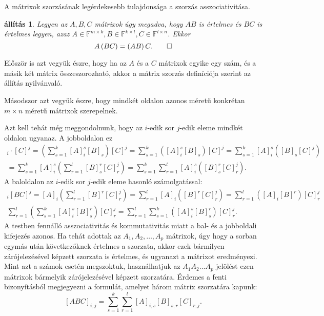 \documentclass[a4paper, showtrims]{memoir}
\makeatletter
\renewenvironment{proof}[1][\proofname]
    {\par\pushQED{\qed}%
    \normalfont \topsep6\p@\@plus6\p@\relax
    \trivlist
    \item[\hskip\labelsep
        \itshape
    #1\@addpunct{:}]\ignorespaces}
    {\popQED\endtrivlist\@endpefalse}
\theoremstyle{plain}
\newtheorem{proposition}{állítás}[chapter]
\theoremstyle{remark}
\theoremstyle{definition}
\makeatother
\begin{document}
A mátrixok szorzásának legérdekesebb tulajdonsága a szorzás asszociativitása.
\begin{proposition}
	Legyen az $A,B,C$ mátrixok úgy megadva, hogy $AB$ is értelmes és $BC$ is értelmes legyen,
	azaz $A\in\mathbb{F}^{m\times k},B\in\mathbb{F}^{k\times l}, C\in\mathbb{F}^{l\times n}$.
	Ekkor
	\[
		A\left( BC \right)=\left( AB \right)C.\qedhere
	\]
\end{proposition}
\begin{proof}
	Először is azt vegyük észre,
	hogy ha az $A$ és a $C$ mátrixok egyike egy szám,
	és a másik két mátrix összeszorozható,
	akkor a mátrix szorzás definíciója szerint az állítás nyilvánvaló.

	Másodszor azt vegyük észre, hogy mindkét oldalon azonos méretű
	konkrétan $m\times n$ méretű mátrixok szerepelnek.

	Azt kell tehát még meggondolnunk,
	hogy az $i$-edik sor $j$-edik eleme mindkét oldalon ugyanaz.
	A jobboldalon ez
	\begin{multline*}
		[AB]_i\cdot [C]^j
		=
		\left( \sum_{s=1}^k[A]_i^s[B]_s \right)[C]^j
		=
		\sum_{s=1}^k\left([A]_i^s[B]_s\right)[C]^j
		=
		\sum_{s=1}^k[A]_i^s\left([B]_s[C]^j\right)
		\\
		=
		\sum_{s=1}^k[A]_i^s\left(\sum_{r=1}^l[B]_s^r[C]_r^j\right)
		=
		\sum_{s=1}^k\sum_{r=1}^l[A]_i^s([B]_s^r[C]_r^j).
	\end{multline*}
	A baloldalon
	az $i$-edik sor $j$-edik eleme hasonló számolgatással:
	\begin{multline*}
		[A]_i[BC]^j=
		[A]_i\left( \sum_{r=1}^l[B]^r[C]_r^j \right)
		=
		\sum_{r=1}^l[A]_i\left([B]^r[C]_r^j\right)
		=
		\sum_{r=1}^l\left([A]_i[B]^r\right)[C]_r^j
		\\
		\sum_{r=1}^l\left(\sum_{s=1}^k[A]_i^s[B]_s^r\right)[C]_r^j
		=
		\sum_{r=1}^l\sum_{s=1}^k\left([A]_i^s[B]_s^r\right)[C]_r^j.
	\end{multline*}
	A testben fennálló asszociativitás és kommutativitás miatt a bal- és a jobboldali kifejezés azonos.
\end{proof}
Ha tehát adottak az $A_1,A_2,\ldots,A_p$ mátrixok, úgy hogy a sorban egymás után következőknek értelmes a szorzata,
akkor ezek bármilyen zárójelezésével képzett szorzata is értelmes,
és ugyanazt a mátrixot eredményezi.
Mint azt a számok esetén megszoktuk,
használhatjuk az $A_1A_2\dots A_p$ jelölést ezen mátrixok bármelyik zárójelezésével képzett szorzatára.
Érdemes a fenti bizonyításból megjegyezni a formulát,
amelyet három mátrix szorzatára kapunk:
\[
	\left[ ABC \right]_{i,j}
	=
	\sum_{s=1}^k\sum_{r=1}^l\left[ A \right]_{i,s}\left[ B \right]_{s,r}\left[ C \right]_{r,j}.
\]
\end{document}

